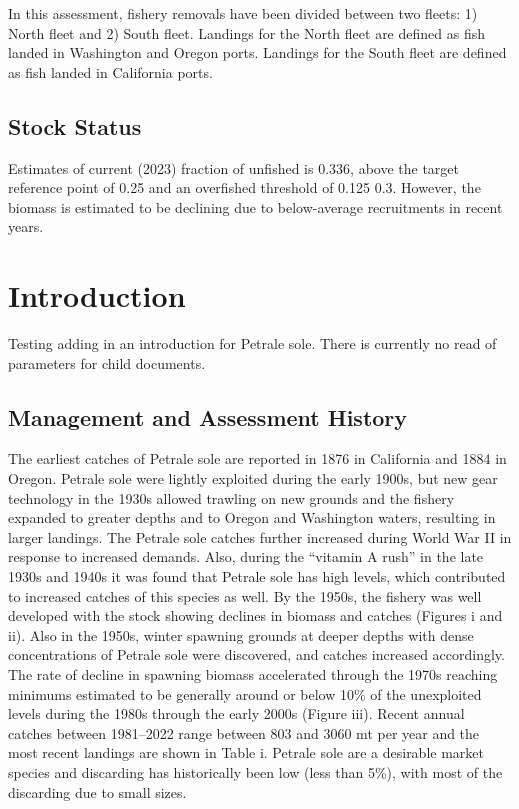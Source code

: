 \documentclass[
]{scrartcl}
\begin{document}
In this assessment, fishery removals have been divided between two
fleets: 1) North fleet and 2) South fleet. Landings for the North fleet
are defined as fish landed in Washington and Oregon ports. Landings for
the South fleet are defined as fish landed in California ports.

\subsection{Stock Status}\label{stock-status}

Estimates of current (2023) fraction of unfished is 0.336, above the
target reference point of 0.25 and an overfished threshold of 0.125 0.3.
However, the biomass is estimated to be declining due to below-average
recruitments in recent years.

\newpage{}

\section{Introduction}\label{introduction}

Testing adding in an introduction for Petrale sole. There is currently
no read of parameters for child documents.

\subsection{Management and Assessment
History}\label{management-and-assessment-history}

The earliest catches of Petrale sole are reported in 1876 in California
and 1884 in Oregon. Petrale sole were lightly exploited during the early
1900s, but new gear technology in the 1930s allowed trawling on new
grounds and the fishery expanded to greater depths and to Oregon and
Washington waters, resulting in larger landings. The Petrale sole
catches further increased during World War II in response to increased
demands. Also, during the ``vitamin A rush'' in the late 1930s and 1940s
it was found that Petrale sole has high levels, which contributed to
increased catches of this species as well. By the 1950s, the fishery was
well developed with the stock showing declines in biomass and catches
(Figures i and ii). Also in the 1950s, winter spawning grounds at deeper
depths with dense concentrations of Petrale sole were discovered, and
catches increased accordingly. The rate of decline in spawning biomass
accelerated through the 1970s reaching minimums estimated to be
generally around or below 10\% of the unexploited levels during the
1980s through the early 2000s (Figure iii). Recent annual catches
between 1981--2022 range between 803 and 3060 mt per year and the most
recent landings are shown in Table i. Petrale sole are a desirable
market species and discarding has historically been low (less than 5\%),
with most of the discarding due to small sizes.
\end{document}

